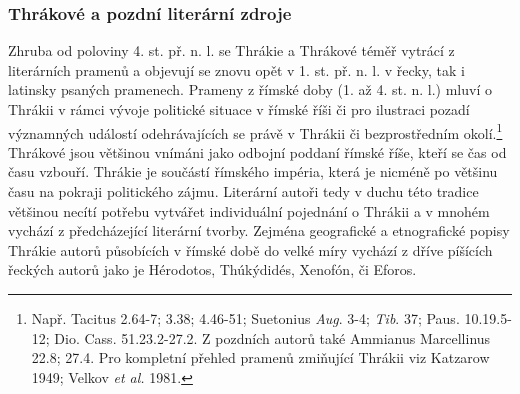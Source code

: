 \subsubsection[thrákové-a-pozdní-literární-zdroje]{Thrákové a pozdní literární zdroje}

Zhruba od poloviny 4. st. př. n. l. se Thrákie a Thrákové téměř vytrácí z literárních pramenů a objevují se znovu opět v 1. st. př. n. l. v řecky, tak i latinsky psaných pramenech. Prameny z římské doby (1. až 4. st. n. l.) mluví o Thrákii v rámci vývoje politické situace v římské říši či pro ilustraci pozadí významných událostí odehrávajících se právě v Thrákii či bezprostředním okolí.\footnote{Např. Tacitus 2.64-7; 3.38; 4.46-51; Suetonius {\em Aug}. 3-4; {\em Tib}. 37; Paus. 10.19.5-12; Dio. Cass. 51.23.2-27.2. Z pozdních autorů také Ammianus Marcellinus 22.8; 27.4. Pro kompletní přehled pramenů zmiňující Thrákii viz Katzarow 1949; Velkov {\em et al.} 1981.} Thrákové jsou většinou vnímáni jako odbojní poddaní římské říše, kteří se čas od času vzbouří. Thrákie je součástí římského impéria, která je nicméně po většinu času na pokraji politického zájmu. Literární autoři tedy v duchu této tradice většinou necítí potřebu vytvářet individuální pojednání o Thrákii a v mnohém vychází z předcházející literární tvorby. Zejména geografické a etnografické popisy Thrákie autorů působících v římské době do velké míry vychází z dříve píšících řeckých autorů jako je Hérodotos, Thúkýdidés, Xenofón, či Eforos.

